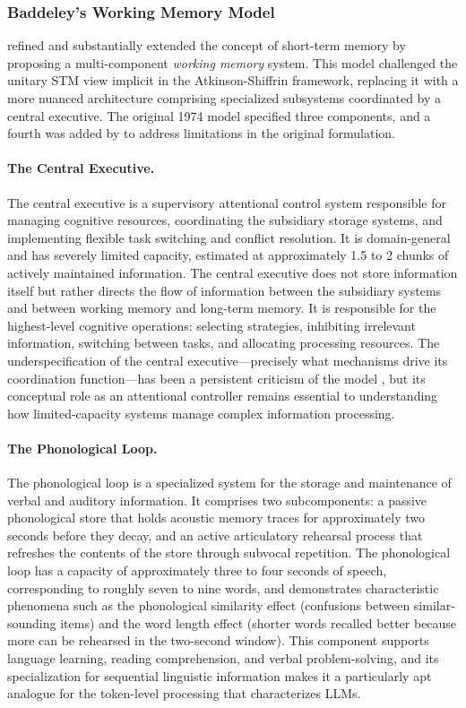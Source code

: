 \subsubsection{Baddeley's Working Memory Model}

\citet{baddeley1974working} refined and substantially extended the concept of short-term memory by proposing a multi-component \emph{working memory} system. This model challenged the unitary STM view implicit in the Atkinson-Shiffrin framework, replacing it with a more nuanced architecture comprising specialized subsystems coordinated by a central executive. The original 1974 model specified three components, and a fourth was added by \citet{baddeley2000episodic} to address limitations in the original formulation.

\paragraph{The Central Executive.} The central executive is a supervisory attentional control system responsible for managing cognitive resources, coordinating the subsidiary storage systems, and implementing flexible task switching and conflict resolution. It is domain-general and has severely limited capacity, estimated at approximately 1.5 to 2 chunks of actively maintained information. The central executive does not store information itself but rather directs the flow of information between the subsidiary systems and between working memory and long-term memory. It is responsible for the highest-level cognitive operations: selecting strategies, inhibiting irrelevant information, switching between tasks, and allocating processing resources. The underspecification of the central executive---precisely what mechanisms drive its coordination function---has been a persistent criticism of the model \citep{baddeley2003working}, but its conceptual role as an attentional controller remains essential to understanding how limited-capacity systems manage complex information processing.

\paragraph{The Phonological Loop.} The phonological loop is a specialized system for the storage and maintenance of verbal and auditory information. It comprises two subcomponents: a passive phonological store that holds acoustic memory traces for approximately two seconds before they decay, and an active articulatory rehearsal process that refreshes the contents of the store through subvocal repetition. The phonological loop has a capacity of approximately three to four seconds of speech, corresponding to roughly seven to nine words, and demonstrates characteristic phenomena such as the phonological similarity effect (confusions between similar-sounding items) and the word length effect (shorter words recalled better because more can be rehearsed in the two-second window). This component supports language learning, reading comprehension, and verbal problem-solving, and its specialization for sequential linguistic information makes it a particularly apt analogue for the token-level processing that characterizes LLMs.

